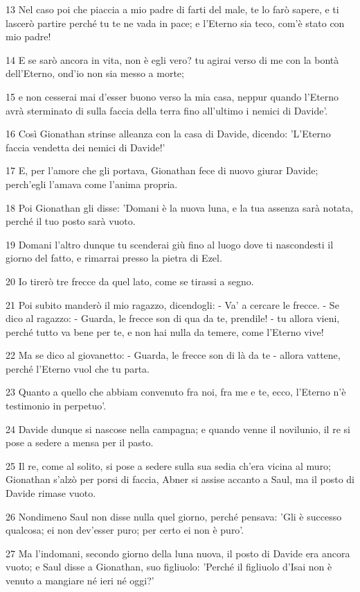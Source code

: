 \par 13 Nel caso poi che piaccia a mio padre di farti del male, te lo farò sapere, e ti lascerò partire perché tu te ne vada in pace; e l'Eterno sia teco, com'è stato con mio padre!
\par 14 E se sarò ancora in vita, non è egli vero? tu agirai verso di me con la bontà dell'Eterno, ond'io non sia messo a morte;
\par 15 e non cesserai mai d'esser buono verso la mia casa, neppur quando l'Eterno avrà sterminato di sulla faccia della terra fino all'ultimo i nemici di Davide'.
\par 16 Così Gionathan strinse alleanza con la casa di Davide, dicendo: 'L'Eterno faccia vendetta dei nemici di Davide!'
\par 17 E, per l'amore che gli portava, Gionathan fece di nuovo giurar Davide; perch'egli l'amava come l'anima propria.
\par 18 Poi Gionathan gli disse: 'Domani è la nuova luna, e la tua assenza sarà notata, perché il tuo posto sarà vuoto.
\par 19 Domani l'altro dunque tu scenderai giù fino al luogo dove ti nascondesti il giorno del fatto, e rimarrai presso la pietra di Ezel.
\par 20 Io tirerò tre frecce da quel lato, come se tirassi a segno.
\par 21 Poi subito manderò il mio ragazzo, dicendogli: - Va' a cercare le frecce. - Se dico al ragazzo: - Guarda, le frecce son di qua da te, prendile! - tu allora vieni, perché tutto va bene per te, e non hai nulla da temere, come l'Eterno vive!
\par 22 Ma se dico al giovanetto: - Guarda, le frecce son di là da te - allora vattene, perché l'Eterno vuol che tu parta.
\par 23 Quanto a quello che abbiam convenuto fra noi, fra me e te, ecco, l'Eterno n'è testimonio in perpetuo'.
\par 24 Davide dunque si nascose nella campagna; e quando venne il novilunio, il re si pose a sedere a mensa per il pasto.
\par 25 Il re, come al solito, si pose a sedere sulla sua sedia ch'era vicina al muro; Gionathan s'alzò per porsi di faccia, Abner si assise accanto a Saul, ma il posto di Davide rimase vuoto.
\par 26 Nondimeno Saul non disse nulla quel giorno, perché pensava: 'Gli è successo qualcosa; ei non dev'esser puro; per certo ei non è puro'.
\par 27 Ma l'indomani, secondo giorno della luna nuova, il posto di Davide era ancora vuoto; e Saul disse a Gionathan, suo figliuolo: 'Perché il figliuolo d'Isai non è venuto a mangiare né ieri né oggi?'
